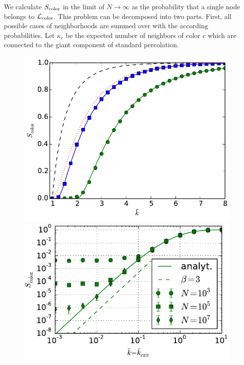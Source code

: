 \documentclass[aps, pre, twocolumn, a4paper, superscriptaddress, floatfix]{revtex4}
\begin{document}
We calculate $S_{\rm color}$ in the limit of $N\to \infty$ as the probability that a
single node belongs to $\mathcal{L}_{\rm color}$. 
This problem can be decomposed into two parts. 
First, all possible cases of neighborhoods are summed over with the according probabilities. 
Let $\kappa_c$ be the expected number of neighbors of color $c$ which are connected to the giant component of standard percolation.
\begin{figure}[htb]
\begin{center}
    \includegraphics[width=1.0\columnwidth]{S_color_poisson.pdf}
    \includegraphics[width=1.0\columnwidth]{testtest.pdf}

\end{center}
\end{figure}
\end{document}
